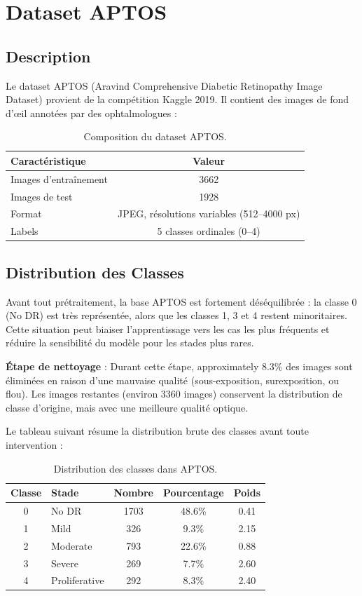 \documentclass[12pt,a4paper,oneside]{report}
\begin{document}
\section{Dataset APTOS}

\subsection{Description}

Le dataset APTOS (Aravind Comprehensive Diabetic Retinopathy Image Dataset)
provient de la compétition Kaggle 2019. Il contient des images de fond d'œil
annotées par des ophtalmologues :

\begin{table}[H]
\centering
\caption{Composition du dataset APTOS.}
\label{tab:aptos}
\begin{tabular}{|l|c|}
\hline
\textbf{Caractéristique} & \textbf{Valeur} \\
\hline
Images d'entraînement & 3662 \\
Images de test & 1928 \\
Format & JPEG, résolutions variables (512--4000 px) \\
Labels & 5 classes ordinales (0--4) \\
\hline
\end{tabular}
\end{table}

\subsection{Distribution des Classes}

Avant tout prétraitement, la base APTOS est fortement déséquilibrée : la classe 0 (No DR) est très représentée, alors que les classes 1, 3 et 4 restent minoritaires. Cette situation peut biaiser l'apprentissage vers les cas les plus fréquents et réduire la sensibilité du modèle pour les stades plus rares.

\textbf{Étape de nettoyage} : Durant cette étape, approximately 8.3\% des images sont éliminées en raison d'une mauvaise qualité (sous-exposition, surexposition, ou flou). Les images restantes (environ 3360 images) conservent la distribution de classe d'origine, mais avec une meilleure qualité optique.

Le tableau suivant résume la distribution brute des classes avant toute intervention :

\begin{table}[H]
\centering
\caption{Distribution des classes dans APTOS.}
\label{tab:class_distribution}
\begin{tabular}{|c|l|c|c|c|}
\hline
\textbf{Classe} & \textbf{Stade} & \textbf{Nombre} & \textbf{Pourcentage} & \textbf{Poids} \\
\hline
0 & No DR & 1703 & 48.6\% & 0.41 \\
1 & Mild & 326 & 9.3\% & 2.15 \\
2 & Moderate & 793 & 22.6\% & 0.88 \\
3 & Severe & 269 & 7.7\% & 2.60 \\
4 & Proliferative & 292 & 8.3\% & 2.40 \\
\hline
\end{tabular}
\end{table}
\end{document}
